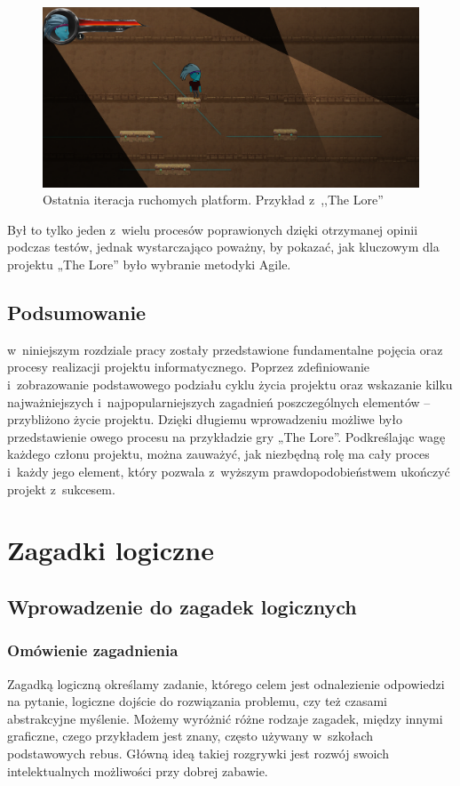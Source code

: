\documentclass[oneside,polski,logo]{amuthesis}
\begin{document}
\begin{figure}[h!]
	\centering
	\includegraphics[width=14cm]{images/hyps/platfAfter.png}
	\caption{Ostatnia iteracja ruchomych platform. Przykład z~,,The Lore''}
\end{figure}

Był to tylko jeden z~wielu procesów poprawionych dzięki otrzymanej opinii podczas testów, jednak wystarczająco poważny, by pokazać, jak kluczowym dla projektu „The Lore” było wybranie metodyki Agile.

\section{Podsumowanie}
w~niniejszym rozdziale pracy zostały przedstawione fundamentalne pojęcia oraz procesy realizacji projektu informatycznego. Poprzez zdefiniowanie i~zobrazowanie podstawowego podziału cyklu życia projektu oraz wskazanie kilku najważniejszych i~najpopularniejszych zagadnień poszczególnych elementów – przybliżono życie projektu. Dzięki długiemu wprowadzeniu możliwe było przedstawienie owego procesu na przykładzie gry „The Lore”. Podkreślając wagę każdego członu projektu, można zauważyć, jak niezbędną rolę ma cały proces i~każdy jego element, który pozwala z~wyższym prawdopodobieństwem ukończyć projekt z~sukcesem.

\chapter{Zagadki logiczne}
\section{Wprowadzenie do zagadek logicznych}
\subsection{Omówienie zagadnienia}
\par Zagadką logiczną określamy zadanie, którego celem jest odnalezienie odpowiedzi na pytanie, logiczne dojście do rozwiązania problemu, czy też czasami abstrakcyjne myślenie. Możemy wyróżnić różne rodzaje zagadek, między innymi graficzne, czego przykładem jest znany, często używany w~szkołach podstawowych rebus. Główną ideą takiej rozgrywki jest rozwój swoich intelektualnych możliwości przy dobrej zabawie. \cite{zagadka_logiczna}
\end{document}

